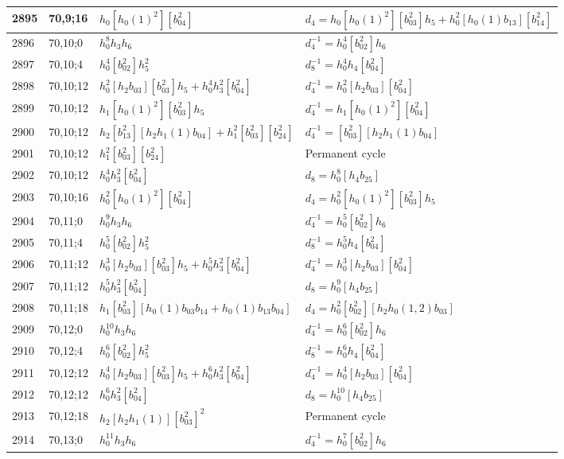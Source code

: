 \documentclass{article}
\begin{document}
\begin{longtable}{|l|l|>{\raggedright\arraybackslash}p{6cm}|>{\raggedright\arraybackslash}p{6cm}|}
\hline
2895 & 70,9;16 & $h_0[h_0(1)^2][b_{04}^2]$ &$d_{4}=h_0[h_0(1)^2][b_{03}^2]h_5 + h_0^2[h_0(1)b_{13}][b_{14}^2]$\\
\hline
2896 & 70,10;0 & $h_0^8h_3h_6$ & $d_{4}^{-1}=h_0^4[b_{02}^2]h_6$\\
\hline
2897 & 70,10;4 & $h_0^4[b_{02}^2]h_5^2$ & $d_{8}^{-1}=h_0^4h_4[b_{04}^2]$\\
\hline
2898 & 70,10;12 & $h_0^2[h_2b_{03}][b_{03}^2]h_5 + h_0^4h_3^2[b_{04}^2]$ & $d_{4}^{-1}=h_0^2[h_2b_{03}][b_{04}^2]$\\
2899 & 70,10;12 & $h_1[h_0(1)^2][b_{03}^2]h_5$ & $d_{4}^{-1}=h_1[h_0(1)^2][b_{04}^2]$\\
2900 & 70,10;12 & $h_2[b_{13}^2][h_2h_1(1)b_{04}] + h_1^2[b_{03}^2][b_{24}^2]$ & $d_{4}^{-1}=[b_{03}^2][h_2h_1(1)b_{04}]$\\
2901 & 70,10;12 & $h_1^2[b_{03}^2][b_{24}^2]$ & Permanent cycle\\
2902 & 70,10;12 & $h_0^4h_3^2[b_{04}^2]$ &$d_{8}=h_0^8[h_4b_{25}]$\\
\hline
2903 & 70,10;16 & $h_0^2[h_0(1)^2][b_{04}^2]$ &$d_{4}=h_0^2[h_0(1)^2][b_{03}^2]h_5$\\
\hline
2904 & 70,11;0 & $h_0^9h_3h_6$ & $d_{4}^{-1}=h_0^5[b_{02}^2]h_6$\\
\hline
2905 & 70,11;4 & $h_0^5[b_{02}^2]h_5^2$ & $d_{8}^{-1}=h_0^5h_4[b_{04}^2]$\\
\hline
2906 & 70,11;12 & $h_0^3[h_2b_{03}][b_{03}^2]h_5 + h_0^5h_3^2[b_{04}^2]$ & $d_{4}^{-1}=h_0^3[h_2b_{03}][b_{04}^2]$\\
2907 & 70,11;12 & $h_0^5h_3^2[b_{04}^2]$ &$d_{8}=h_0^9[h_4b_{25}]$\\
\hline
2908 & 70,11;18 & $h_1[b_{03}^2][h_0(1)b_{03}b_{14} + h_0(1)b_{13}b_{04}]$ &$d_{4}=h_0^2[b_{02}^2][h_2h_0(1, 2)b_{03}]$\\
\hline
2909 & 70,12;0 & $h_0^{10}h_3h_6$ & $d_{4}^{-1}=h_0^6[b_{02}^2]h_6$\\
\hline
2910 & 70,12;4 & $h_0^6[b_{02}^2]h_5^2$ & $d_{8}^{-1}=h_0^6h_4[b_{04}^2]$\\
\hline
2911 & 70,12;12 & $h_0^4[h_2b_{03}][b_{03}^2]h_5 + h_0^6h_3^2[b_{04}^2]$ & $d_{4}^{-1}=h_0^4[h_2b_{03}][b_{04}^2]$\\
2912 & 70,12;12 & $h_0^6h_3^2[b_{04}^2]$ &$d_{8}=h_0^{10}[h_4b_{25}]$\\
\hline
2913 & 70,12;18 & $h_2[h_2h_1(1)][b_{03}^2]^2$ & Permanent cycle\\
\hline
2914 & 70,13;0 & $h_0^{11}h_3h_6$ & $d_{4}^{-1}=h_0^7[b_{02}^2]h_6$\\

\end{longtable}
\end{document}
